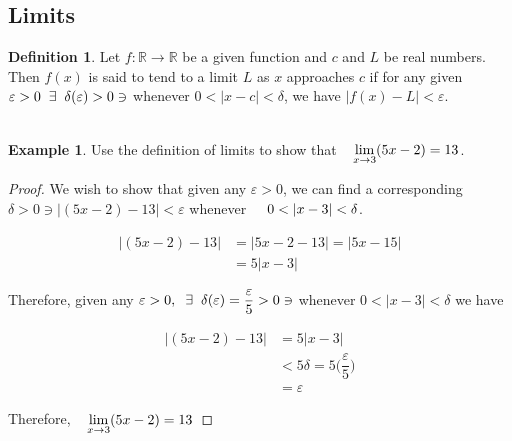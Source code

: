 \documentclass[11pt,a4paper]{article}
\theoremstyle{definition}
\newtheorem{defn}[thm]{Definition}
\newtheorem{exa}[thm]{Example}
\begin{document}
\subsection{Limits}

\begin{defn}


Let $f:\mathbb{R}\longrightarrow \mathbb{R}$ be a given function and $c$ and $L$ be real numbers. Then $f(x)$ is said to tend to a limit $L$ as $x$ approaches $c$ if for any given $\varepsilon > 0 \hspace{0.2cm}\exists\hspace{0.2cm} \delta (\varepsilon) > 0 \ni$ whenever $0< \left|x - c\right|< \delta$, we have $\left|f(x) - L\right| < \varepsilon$.\\\\
\end{defn}

\begin{exa}


Use the definition of limits to show that $\hspace{0.3cm}\displaystyle{\lim\limits_{x\rightarrow 3} (5x - 2) = 13}$.
\end{exa}


\begin{proof}


We wish to show that given any $\varepsilon  > 0$, we can find a corresponding $\delta > 0 \ni \left|(5x -2) - 13\right| < \varepsilon$ whenever $\hspace{0.4cm} 0 < \left|x - 3\right| < \delta$.

\begin{align*}
\left|(5x - 2) - 13\right| & = \left|5x - 2 -13\right| = \left|5x - 15\right|\\
& =  5 \left|x - 3\right|
\end{align*}

Therefore, given any $\varepsilon > 0, \hspace{0.2cm} \exists \hspace{0.2cm} \delta (\varepsilon) = \dfrac{\varepsilon}{5}> 0 \ni$ whenever $0< \left|x - 3\right| < \delta$ we have 

\begin{align*}
\left|(5x - 2) - 13\right| & = 5\left|x - 3\right|\\
& < 5\delta = 5\Big(\dfrac{\varepsilon}{5}\Big)\\
& = \varepsilon
\end{align*}

Therefore, $\hspace{0.3cm}\displaystyle{\lim\limits_{x\rightarrow 3} (5x - 2) = 13}$
\end{proof}
\end{document}
